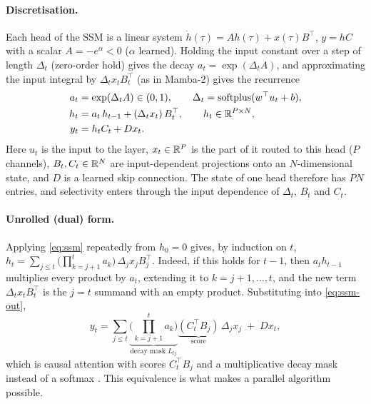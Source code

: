 \paragraph{Discretisation.} Each head of the SSM is a linear system $\dot h(\tau) = A h(\tau) + x(\tau) B^\top$,
$y = hC$ with a scalar $A=-e^{\alpha}<0$ ($\alpha$ learned). Holding the input constant over a step of length
$\Delta_t$ (zero-order hold) gives the decay $a_t = \exp(\Delta_t A)$, and approximating the input integral by
$\Delta_t x_t B_t^\top$ (as in Mamba-2) gives the recurrence
\begin{align}
  a_t &= \exp(\Delta_t A) \in (0,1), \qquad \Delta_t = \operatorname{softplus}(w^\top u_t + b), \label{eq:disc}\\
  h_t &= a_t\, h_{t-1} + (\Delta_t x_t)\, B_t^\top, \qquad h_t \in \mathbb{R}^{P\times N}, \label{eq:ssm}\\
  y_t &= h_t C_t + D x_t . \label{eq:ssm-out}
\end{align}
Here $u_t$ is the input to the layer, $x_t\in\mathbb{R}^P$ is the part of it routed to this head ($P$ channels),
$B_t, C_t\in\mathbb{R}^N$ are input-dependent projections onto an $N$-dimensional state, and $D$ is a learned skip
connection. The state of one head therefore has $PN$ entries, and selectivity enters through the
input dependence of $\Delta_t$, $B_t$ and $C_t$.

\paragraph{Unrolled (dual) form.} Applying \eqref{eq:ssm} repeatedly from $h_0=0$ gives, by induction on $t$,
$h_t = \sum_{j\le t}\big(\prod_{k=j+1}^{t} a_k\big)\,\Delta_j x_j B_j^\top$. Indeed, if this holds for $t-1$,
then $a_t h_{t-1}$ multiplies every product by $a_t$, extending it to $k=j+1,\dots,t$, and the new term
$\Delta_t x_t B_t^\top$ is the $j=t$ summand with an empty product. Substituting into \eqref{eq:ssm-out},
\begin{equation}
  y_t = \sum_{j\le t} \underbrace{\Big(\prod_{k=j+1}^{t} a_k\Big)}_{\text{decay mask } L_{tj}}
        \underbrace{(C_t^\top B_j)}_{\text{score}}\, \Delta_j x_j \;+\; D x_t ,
  \label{eq:dual}
\end{equation}
which is causal attention with scores $C_t^\top B_j$ and a multiplicative decay mask instead of a softmax
\citep{dao2024ssd}. This equivalence is what makes a parallel algorithm possible.

